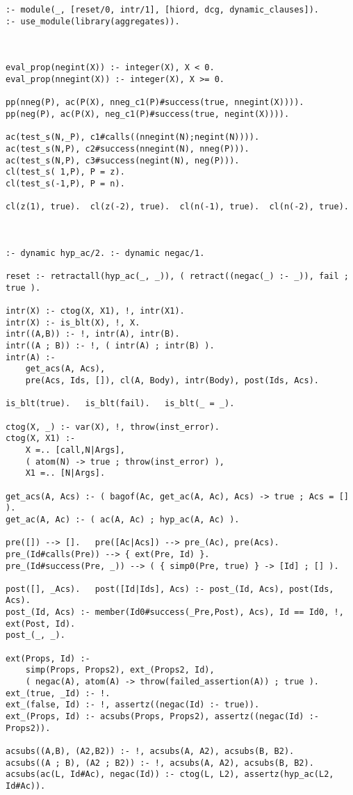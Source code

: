 \documentclass{llncs}
\begin{document}
{
\small  
\begin{verbatim}
:- module(_, [reset/0, intr/1], [hiord, dcg, dynamic_clauses]).
:- use_module(library(aggregates)).



eval_prop(negint(X)) :- integer(X), X < 0.
eval_prop(nnegint(X)) :- integer(X), X >= 0.

pp(nneg(P), ac(P(X), nneg_c1(P)#success(true, nnegint(X)))).
pp(neg(P), ac(P(X), neg_c1(P)#success(true, negint(X)))).

ac(test_s(N,_P), c1#calls((nnegint(N);negint(N)))).
ac(test_s(N,P), c2#success(nnegint(N), nneg(P))).
ac(test_s(N,P), c3#success(negint(N), neg(P))).
cl(test_s( 1,P), P = z).
cl(test_s(-1,P), P = n).

cl(z(1), true).  cl(z(-2), true).  cl(n(-1), true).  cl(n(-2), true).



:- dynamic hyp_ac/2. :- dynamic negac/1. 

reset :- retractall(hyp_ac(_, _)), ( retract((negac(_) :- _)), fail ; true ).

intr(X) :- ctog(X, X1), !, intr(X1).
intr(X) :- is_blt(X), !, X.
intr((A,B)) :- !, intr(A), intr(B).
intr((A ; B)) :- !, ( intr(A) ; intr(B) ).
intr(A) :-
    get_acs(A, Acs),
    pre(Acs, Ids, []), cl(A, Body), intr(Body), post(Ids, Acs).

is_blt(true).   is_blt(fail).   is_blt(_ = _).

ctog(X, _) :- var(X), !, throw(inst_error).
ctog(X, X1) :-
    X =.. [call,N|Args],
    ( atom(N) -> true ; throw(inst_error) ),
    X1 =.. [N|Args].

get_acs(A, Acs) :- ( bagof(Ac, get_ac(A, Ac), Acs) -> true ; Acs = [] ).
get_ac(A, Ac) :- ( ac(A, Ac) ; hyp_ac(A, Ac) ).

pre([]) --> [].   pre([Ac|Acs]) --> pre_(Ac), pre(Acs).
pre_(Id#calls(Pre)) --> { ext(Pre, Id) }.
pre_(Id#success(Pre, _)) --> ( { simp0(Pre, true) } -> [Id] ; [] ).

post([], _Acs).   post([Id|Ids], Acs) :- post_(Id, Acs), post(Ids, Acs).
post_(Id, Acs) :- member(Id0#success(_Pre,Post), Acs), Id == Id0, !, ext(Post, Id).
post_(_, _).

ext(Props, Id) :-
    simp(Props, Props2), ext_(Props2, Id),
    ( negac(A), atom(A) -> throw(failed_assertion(A)) ; true ).
ext_(true, _Id) :- !.
ext_(false, Id) :- !, assertz((negac(Id) :- true)).
ext_(Props, Id) :- acsubs(Props, Props2), assertz((negac(Id) :- Props2)).

acsubs((A,B), (A2,B2)) :- !, acsubs(A, A2), acsubs(B, B2).
acsubs((A ; B), (A2 ; B2)) :- !, acsubs(A, A2), acsubs(B, B2).
acsubs(ac(L, Id#Ac), negac(Id)) :- ctog(L, L2), assertz(hyp_ac(L2, Id#Ac)).


\end{verbatim}}
\end{document}
